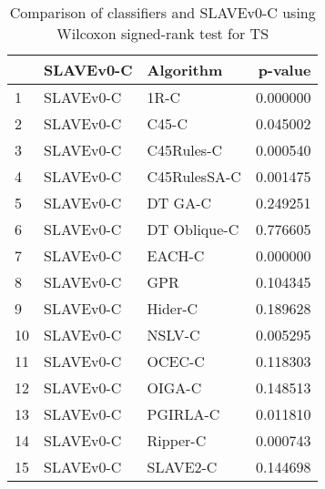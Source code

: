 \begin{table}
\footnotesize
\caption{Comparison of classifiers and SLAVEv0-C using Wilcoxon signed-rank test for TS}
\label{tab:SLAVEv0-C wilcoxon TS comparison}
\begin{tabular}{lllr}
\hline
 & SLAVEv0-C & Algorithm & p-value \\
\hline
1 & SLAVEv0-C & 1R-C & 0.000000 \\
2 & SLAVEv0-C & C45-C & 0.045002 \\
3 & SLAVEv0-C & C45Rules-C & 0.000540 \\
4 & SLAVEv0-C & C45RulesSA-C & 0.001475 \\
5 & SLAVEv0-C & DT GA-C & 0.249251 \\
6 & SLAVEv0-C & DT Oblique-C & 0.776605 \\
7 & SLAVEv0-C & EACH-C & 0.000000 \\
8 & SLAVEv0-C & GPR & 0.104345 \\
9 & SLAVEv0-C & Hider-C & 0.189628 \\
10 & SLAVEv0-C & NSLV-C & 0.005295 \\
11 & SLAVEv0-C & OCEC-C & 0.118303 \\
12 & SLAVEv0-C & OIGA-C & 0.148513 \\
13 & SLAVEv0-C & PGIRLA-C & 0.011810 \\
14 & SLAVEv0-C & Ripper-C & 0.000743 \\
15 & SLAVEv0-C & SLAVE2-C & 0.144698 \\
\hline
\end{tabular}
\end{table}
